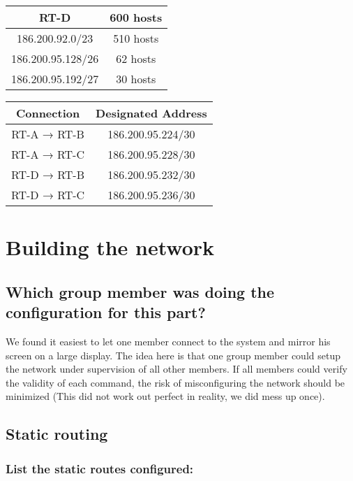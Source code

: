 \documentclass[a4paper, titlepage,12pt]{article}
\begin{document}
		\begin{center}
			\begin{tabular}{|c|c|}
				\hline
				RT-D & 600 hosts \\
				\hline
				186.200.92.0/23 & 510 hosts \\
				\hline
				186.200.95.128/26 & 62 hosts \\
				\hline
				186.200.95.192/27 & 30 hosts \\
				\hline
			\end{tabular}
		\end{center}

		\begin{center}
			\begin{tabular}{|c|c|}
				\hline
				\textbf{Connection} & \textbf{Designated Address} \\
				\hline
				RT-A → RT-B & 186.200.95.224/30\\
				\hline
				RT-A → RT-C & 186.200.95.228/30\\
				\hline
				RT-D → RT-B & 186.200.95.232/30\\
				\hline
				RT-D → RT-C & 186.200.95.236/30\\
				\hline
			\end{tabular}
		\end{center}

	\section{Building the network}
		\subsection{Which group member was doing the configuration for this part?}
			We found it easiest to let one member connect to the system and mirror his screen on a large display. The idea here is that one group member could setup the network under supervision of all other members. If all members could verify the validity of each command, the risk of misconfiguring the network should be minimized (This did not work out perfect in reality, we did mess up once).

		\subsection{Static routing}

		\subsubsection{List the static routes configured:}
\end{document}
